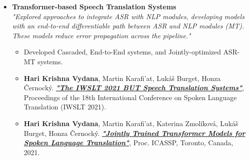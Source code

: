 \documentclass[11pt,a4paper,sans]{moderncv} %
\begin{document}
\begin{itemize}[labelwidth=2mm,labelindent=8pt,leftmargin=2cm,align=left]
\item[$\bullet$] \textbf{Transformer-based Speech Translation Systems}\\
\textit{\scriptsize "Explored approaches to integrate ASR with NLP modules, developing models with an end-to-end differentiable path between ASR and NLP modules (MT). These models reduce error propagation across the pipeline."}
\begin{itemize}[itemsep=1mm,labelwidth=0mm,labelindent=5pt,leftmargin=1cm,align=left]
    \scriptsize
    \item[\tiny$\bullet$] Developed Cascaded, End-to-End systems, and Jointly-optimized ASR-MT systems.
    \item[\tiny$\bullet$] \textbf{Hari Krishna Vydana}, Martin Karafi'at, Lukáš Burget, Honza Černocký. \newline \href{https://arxiv.org/abs/2107.06155}{\textbf{\textit{"The IWSLT 2021 BUT Speech Translation Systems"}}}, Proceedings of the 18th International Conference on Spoken Language Translation (IWSLT 2021).
    \item[\tiny$\bullet$] \textbf{Hari Krishna Vydana}, Martin Karafi'at, Katerina Zmolíková, Lukáš Burget, Honza Černocký. \newline \href{https://ieeexplore.ieee.org/document/9414159}{\textbf{\textit{"Jointly Trained Transformer Models for Spoken Language Translation"}}}, Proc. ICASSP, Toronto, Canada, 2021.
\end{itemize}




\end{itemize}
\end{document}
